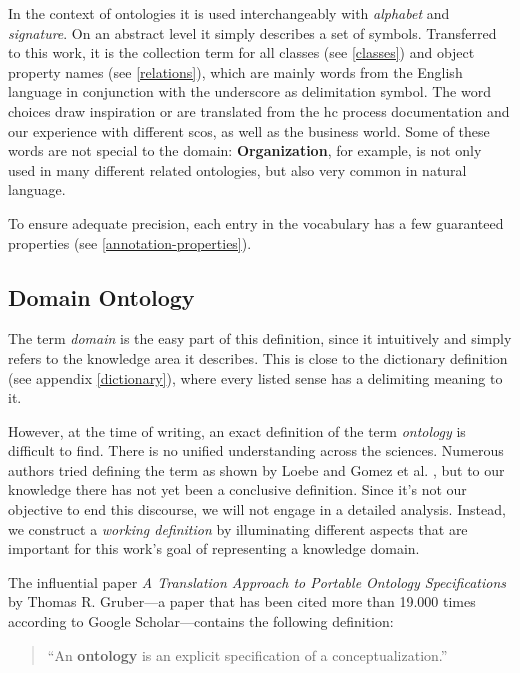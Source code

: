 \documentclass[a4paper, DIV=13, BCOR=0cm]{scrbook}
\begin{document}
In the context of ontologies it is used interchangeably with \textit{alphabet} and \textit{signature}. On an abstract level it simply describes a set of symbols. \cite[p.\,46]{loebe2015ontological} Transferred to this work, it is the collection term for all classes (see \ref{classes}) and object property names (see \ref{relations}), which are mainly words from the English language in conjunction with the underscore as delimitation symbol. The word choices draw inspiration or are translated from the \gls{hc} process documentation and our experience with different \glspl{sco}, as well as the business world. Some of these words are not special to the domain: \textbf{Organization}, for example, is not only used in many different related ontologies, but also very common in natural language.

To ensure adequate precision, each entry in the vocabulary has a few guaranteed properties (see \ref{annotation-properties}).

\subsection{Domain Ontology}
The term \textit{domain} is the easy part of this definition, since it intuitively and simply refers to the knowledge area it describes. \cite[p.\,7]{loebe2015ontological} This is close to the dictionary definition (see appendix \ref{dictionary}), where every listed sense has a delimiting meaning to it. \cite{mw-dictionary}

However, at the time of writing, an exact definition of the term \textit{ontology} is difficult to find. There is no unified understanding across the sciences. \cite{Hesse_2014} Numerous authors tried defining the term as shown by Loebe \cite[p.\,4-6]{loebe2015ontological} and Gomez et al. \cite[p.\, 6--9]{Gomez-Perez:2004aa}, but to our knowledge there has not yet been a conclusive definition. Since it's not our objective to end this discourse, we will not engage in a detailed analysis. Instead, we construct a \textit{working definition} by illuminating different aspects that are important for this work's goal of representing a knowledge domain.

The influential paper \cite[p.\,9]{schulz2012guideline} \cite[p.\,4]{loebe2015ontological} \textit{A Translation Approach to Portable Ontology Specifications} by Thomas R. Gruber---a paper that has been cited more than 19.000 times according to Google Scholar---contains the following definition:

\begin{quote}
	\enquote{An \textbf{ontology} is an explicit specification of a conceptualization.} \cite[p.\, 1]{gruber1993translation}
\end{quote}
\end{document}

